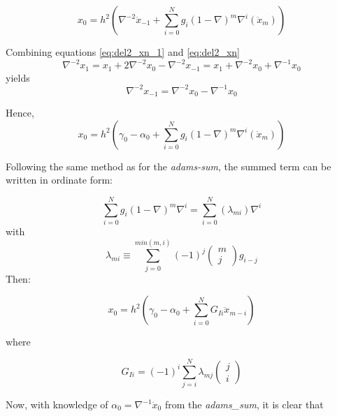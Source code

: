 \begin{equation*}
x_{0}=h^{2}\left(\nabla ^{-2}{\ddot{x}}_{-1}+
\sum_{i=0}^{N}g_{i}(1-\nabla )^{m}\nabla ^{i}({\ddot{x}}_{m})\right)
\end{equation*}

Combining equations \ref{eq:del2_xn_1} and \ref{eq:del2_xn} 
\begin{equation*}
\nabla ^{-2}x_{1} = x_{1}+2 \nabla ^{-2}x_{0} - \nabla ^{-2}x_{-1} = x_{1}+\nabla ^{-2}x_{0}+\nabla ^{-1}x_{0}
\end{equation*}
yields
\begin{equation*}
\nabla ^{-2}x_{-1}=\nabla ^{-2}x_{0}-\nabla ^{-1}x_{0}
\end{equation*}

Hence,
\begin{equation*}
x_{0}=h^{2}\left(\gamma_{0}-\alpha_{0}+\sum
_{i=0}^{N}g_{i}(1-\nabla )^{m}\nabla ^{i}({\ddot{x}}_{m})\right)
\end{equation*}

Following the same method as for the \textit{adams-sum}, the summed term
can be written in ordinate form:

\begin{equation*}
\sum_{i=0}^{N}g_{i}(1-\nabla )^{m}\nabla ^{i} =
\sum_{i=0}^{N}\left(\lambda_{mi}\right)\nabla ^{i}
\end{equation*}
with
\begin{equation*}
\lambda_{mi} \equiv \sum_{j=0}^{min(m,i)}(-1)^{j}
\left(\begin{matrix}m\\j\end{matrix}\right) g_{i-j}
\end{equation*}
Then:

\begin{equation*}
x_{0}=h^{2}\left(\gamma_{0}-\alpha_{0}+
\sum_{i=0}^{N}G_{Ii} \ddot{x}_{m-i}\right)
\end{equation*}

where

\begin{equation} \label{eq:G_Ii}
G_{Ii}=(-1)^{i}\sum_{j=i}^{N}\lambda_{mj}\left(
\begin{matrix}j\\i\end{matrix}\right)
\end{equation}

Now, with knowledge of  $\alpha_0 = \nabla ^{-1}{\ddot{x}}_{0}$ from the
\textit{adams\_sum}, it is clear that

